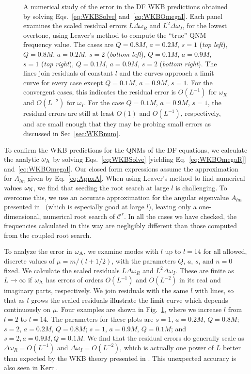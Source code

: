 \begin{refsection}
\begin{figure}[tb]
\caption{A numerical study of the error in the DF WKB predictions obtained by solving Eqs.~\eqref{eq:WKBSolve} and~\eqref{eq:WKBOmegaI}. Each panel examines the scaled residual errors $L\Delta \omega_{R}$ and $L^2\Delta \omega_{I}$, for the lowest overtone, using Leaver's method to compute the ``true'' QNM frequency value.
The cases are $Q=0.8M$, $a=0.2M$, $s = 1$ ({\it top left}),  $Q=0.8M$, $a=0.2M$, $s = 2$ ({\it bottom left}), $Q=0.1M$, $a=0.9M$, $s = 1$ ({\it top right}), $Q=0.1M$, $a=0.9M$, $s = 2$ ({\it bottom right}). 
The lines join residuals of constant $l$ and the curves approach a limit curve for every case except  $Q=0.1M$, $a=0.9M$, $s = 1$. For the convergent cases, this indicates the residual error is $O(L^{-1})$ for $\omega_R$ and $O(L^{-2})$ for $\omega_I$. For the case $Q=0.1M$, $a=0.9M$, $s = 1$, the residual errors are still at least $O(1)$ and $O(L^{-1})$, respectively, and are small enough that they may be probing small errors as discussed in Sec~\ref{sec:WKBnum}.}
\label{fig:DFeik}
\end{figure}

To confirm the WKB predictions for the QNMs of the DF equations, we calculate the analytic $\omega_{\rm A}$ by solving Eqs.~\eqref{eq:WKBSolve} [yielding Eq.~\eqref{eq:WKBOmegaR}] and~\eqref{eq:WKBOmegaI}.
Our closed form expressions assume the approximation for $A_{lm}$ given by Eq.~\eqref{eq:AppxA}. 
When using Leaver's method to find numerical values $\omega_{\rm N}$, we find that seeding the root search at large $l$ is challenging.
To overcome this, we use an accurate approximation for the angular eigenvalue $A_{lm}$ presented in~\cite{Berti:2005gp} (which is especially good at large $l$), leaving only a one-dimensional, numerical root search of $\mathcal C^r$.
In all the cases we have checked, the frequencies calculated in this way are negligibly different than those computed from the coupled root search.

To analyze the error in $\omega_{\rm A}$, we examine modes with $l$ up to $l=14$ for all allowed, discrete values of $\mu=m/(l+1/2)$, with the parameters $Q$, $a$, $s$, and $n=0$ fixed. 
We calculate the scaled residuals $L\Delta \omega_R$ and $L^2\Delta \omega_I$.
These are finite as $L\to\infty$ if $\omega_{\rm A}$ has errors of orders $O(L^{-1})$ and $O(L^{-2})$ in its real and imaginary parts, respectively. 
We join residuals with the same $l$ with lines, so that as $l$ grows the scaled residuals illustrate the limit curve which depends continuously on $\mu$. Four examples are shown in Fig.~\ref{fig:DFeik}, where we increase $l$ from $l = 2$ to $l = 14$.
The parameters for these plots are $s = 1$, $a = 0.2M$, $Q = 0.8M$; $s = 2$, $a = 0.2M$, $Q = 0.8M$; $s = 1$, $a = 0.9M$, $Q = 0.1M$; and $s = 2, a = 0.9M, Q = 0.1M$. We find that the residual errors do generally scale as $\Delta\omega_R = O(L^{-1})$ and $\Delta\omega_I = O(L^{-2})$, which is actually one power of $L$ better than expected by the WKB theory presented in \cite{Schutz:1985zz}. This unexpected accuracy is also seen in Kerr \cite{Yang:2012he}.


\end{refsection}

